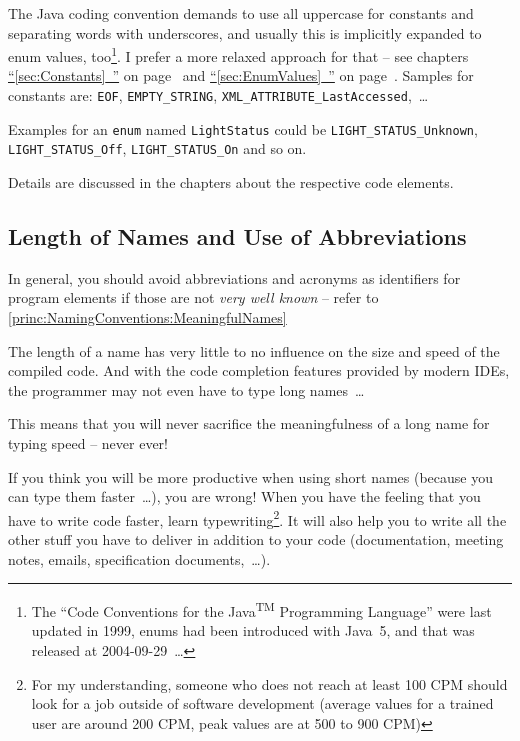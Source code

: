 \documentclass[11pt,a4paper, titlepage, parskip=half, headsepline, footsepline, cleardoublepage=current, headheight=1cm]{scrbook}
\newcommand*{\tqfullvref}[1]{\hyperref[{#1}]{“\ref*{#1}~\nameref*{#1}”} on page~\pageref{#1}}
\begin{document}
The Java coding convention \autocite{SUN_CODE_CONVENTIONS} demands to use all uppercase for constants and separating words with underscores, and usually this is implicitly expanded to enum values, too\footnote{The “Code Conventions for the Java\textsuperscript{TM} Programming Language” \autocite{SUN_CODE_CONVENTIONS} were last updated in 1999, enums had been introduced with Java~5, and that was released at 2004-09-29~…}. I prefer a more relaxed approach for that – see chapters \tqfullvref{sec:Constants} and \tqfullvref{sec:EnumValues}. Samples for constants are: \lstinline|EOF|, \lstinline|EMPTY_STRING|, \lstinline|XML_ATTRIBUTE_LastAccessed|,~…

Examples for an \lstinline|enum| named \lstinline|LightStatus| could be \lstinline|LIGHT_STATUS_Unknown|, \lstinline|LIGHT_STATUS_Off|, \lstinline|LIGHT_STATUS_On| and so on.

Details are discussed in the chapters about the respective code elements.


\subsection{Length of Names and Use of Abbreviations}\label{sec:LengthOfNamesAndUseOfAbbreviations}
In general, you should avoid abbreviations and acronyms as identifiers for program elements if those are not \textit{very well known} – refer to \ref{princ:NamingConventions:MeaningfulNames}

The length of a name has very little to no influence on the size and speed of the compiled code. And with the code completion features provided by modern IDEs, the programmer may not even have to type long names~…

This means that you will never sacrifice the meaningfulness of a long name for typing speed – never ever!

If you think you will be more productive when using short names (because you can type them faster~…), you are wrong! When you have the feeling that you have to write code faster, learn typewriting\footnote{For my understanding, someone who does not reach at least 100 CPM should look for a job outside of software development (average values for a trained user are around 200 CPM, peak values are at 500 to 900 CPM)}. It will also help you to write all the other stuff you have to deliver in addition to your code (documentation, meeting notes, emails, specification documents,~…).
\end{document}
